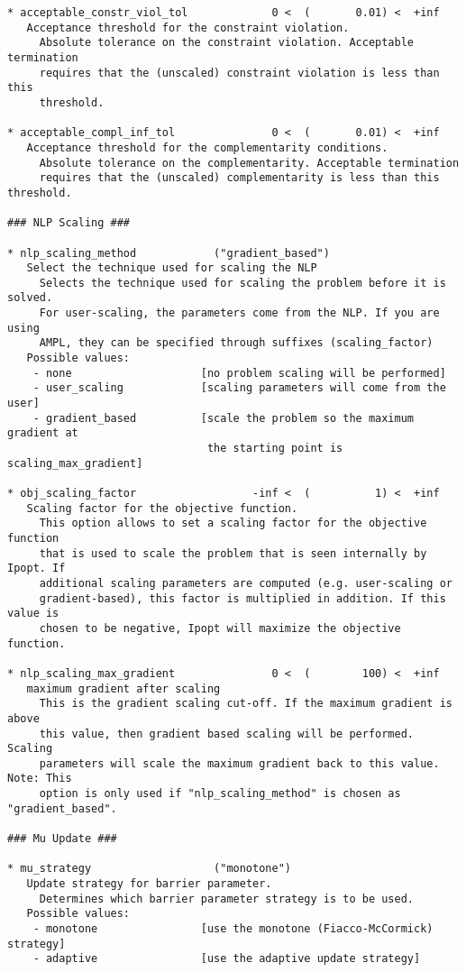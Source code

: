 \documentclass[letter,10pt]{article}
\begin{document}
{\begin{verbatim}
* acceptable_constr_viol_tol             0 <  (       0.01) <  +inf      
   Acceptance threshold for the constraint violation.
     Absolute tolerance on the constraint violation. Acceptable termination
     requires that the (unscaled) constraint violation is less than this
     threshold.

* acceptable_compl_inf_tol               0 <  (       0.01) <  +inf      
   Acceptance threshold for the complementarity conditions.
     Absolute tolerance on the complementarity. Acceptable termination
     requires that the (unscaled) complementarity is less than this threshold.

### NLP Scaling ###

* nlp_scaling_method            ("gradient_based")
   Select the technique used for scaling the NLP
     Selects the technique used for scaling the problem before it is solved.
     For user-scaling, the parameters come from the NLP. If you are using
     AMPL, they can be specified through suffixes (scaling_factor)
   Possible values:
    - none                    [no problem scaling will be performed]
    - user_scaling            [scaling parameters will come from the user]
    - gradient_based          [scale the problem so the maximum gradient at
                               the starting point is scaling_max_gradient]

* obj_scaling_factor                  -inf <  (          1) <  +inf      
   Scaling factor for the objective function.
     This option allows to set a scaling factor for the objective function
     that is used to scale the problem that is seen internally by Ipopt. If
     additional scaling parameters are computed (e.g. user-scaling or
     gradient-based), this factor is multiplied in addition. If this value is
     chosen to be negative, Ipopt will maximize the objective function.

* nlp_scaling_max_gradient               0 <  (        100) <  +inf      
   maximum gradient after scaling
     This is the gradient scaling cut-off. If the maximum gradient is above
     this value, then gradient based scaling will be performed. Scaling
     parameters will scale the maximum gradient back to this value. Note: This
     option is only used if "nlp_scaling_method" is chosen as "gradient_based".

### Mu Update ###

* mu_strategy                   ("monotone")
   Update strategy for barrier parameter.
     Determines which barrier parameter strategy is to be used.
   Possible values:
    - monotone                [use the monotone (Fiacco-McCormick) strategy]
    - adaptive                [use the adaptive update strategy]


\end{verbatim}}
\end{document}
